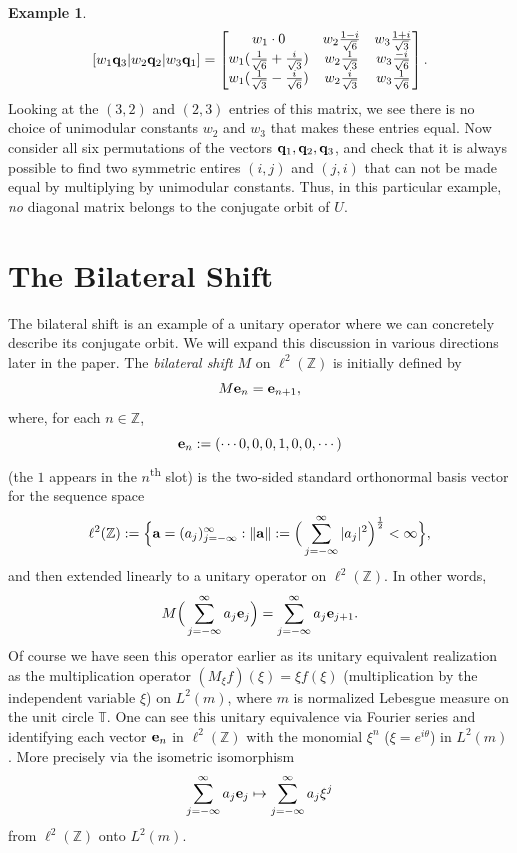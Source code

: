 \documentclass{dis}
\theoremstyle{plain}
\theoremstyle{definition}
\newtheorem{Example}[equation]{Example}
\def\T{\mathbb{T}}
\def\Z{\mathbb{Z}}
\renewcommand{\vec}[1]{{\bf #1}}
\newcommand{\0}{{\color{lightgray}0}}
\begin{document}
\begin{Example}
 $$[w_1 \vec{q}_3 |w_2 \vec{q}_2 | w_3 \vec{q}_1] = \begin{bmatrix}
 w_1 \cdot 0 & w_2 \frac{1-i}{\sqrt{6}} & w_3 \frac{1+i}{\sqrt{3}} \\
 w_1 (\frac{1}{\sqrt{6}}+\frac{i}{\sqrt{3}} )& w_2 \frac{1}{\sqrt{3}} & w_3 \frac{-i}{\sqrt{6}} \\
 w_1 (\frac{1}{\sqrt{3}}-\frac{i}{\sqrt{6}}) & w_2 \frac{i}{\sqrt{3}} & w_3 \frac{1}{\sqrt{6}} \\
\end{bmatrix}.$$
Looking  at the $(3, 2)$ and $(2, 3)$ entries of this matrix, we see there is no choice of unimodular constants $w_2$ and $w_3$ that makes these entries equal. Now consider all six permutations of the vectors $\vec{q}_1, \vec{q}_2, \vec{q}_3$, and check that it is always possible to find two symmetric entires $(i, j)$ and $(j, i)$ that can not be made equal by multiplying by unimodular constants. Thus, in this particular example,  {\em no} diagonal matrix belongs to the conjugate orbit of $U$.
\end{Example}

\chapter{The Bilateral Shift}\label{S-Five}



The bilateral shift is an example of a unitary operator where we can concretely describe its conjugate orbit.  We will expand this discussion in various directions later in the paper. The {\em bilateral shift}  $M$ on $\ell^2(\Z)$  is initially defined by 
$$M \vec{e}_{n} = \vec{e}_{n + 1},$$
where, for each $n \in \Z$, 
$$\vec{e}_n := (\cdots 0, 0, 0, 1, 0, 0, \cdots)$$
(the $1$ appears in the $n$\textsuperscript{th} slot)
 is the two-sided standard orthonormal basis vector for the sequence space 
 \begin{equation}\label{sdfg7sd7fsdf7sdfaaaQQQQ}
 \ell^2(\Z) := \Big\{\vec{a} = (a_j)_{j = -\infty}^{\infty}: \|\vec{a}\| := \Big(\sum_{j = -\infty}^{\infty} |a_j|^{2}\Big)^{\frac{1}{2}} < \infty\Big\},
 \end{equation}
 and then extended linearly to a unitary operator on $\ell^2(\Z)$. In other words, 
 $$M\Big(\sum_{j = -\infty}^{\infty} a_{j} \vec{e}_j \Big)= \sum_{j = -\infty}^{\infty} a_j \vec{e}_{j + 1}.$$ Of course we have seen this operator earlier as its unitary equivalent realization as the multiplication operator $(M_{\xi} f)(\xi) = \xi f(\xi)$ (multiplication by the independent variable $\xi$) on $L^2(m)$, where $m$ is normalized Lebesgue measure on the unit circle $\T$. One can see this unitary equivalence via Fourier series and identifying each vector $\vec{e}_n$ in $\ell^2(\Z)$ with the monomial $\xi^{n}$ ($\xi = e^{i \theta}$) in $L^2(m)$. More precisely via the isometric isomorphism 
 $$\sum_{j = -\infty}^{\infty} a_j \vec{e}_j \mapsto \sum_{j = -\infty}^{\infty} a_j \xi^j$$
 from $\ell^2(\Z)$ onto $L^2(m)$. 
\end{document}
